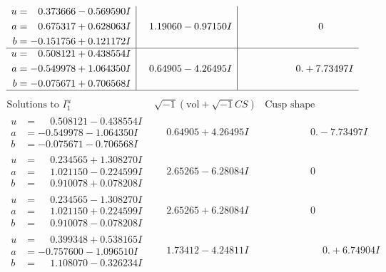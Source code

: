 \documentclass[1p]{elsarticle_modified}
\theoremstyle{definition}
\newcommand{\I}{\sqrt{-1}}
\begin{document}
$$\begin{array}{c|c|c}
\begin{aligned}
u &= \phantom{-}0.373666 - 0.569590 I \\
a &= \phantom{-}0.675317 + 0.628063 I \\
b &= -0.151756 + 0.121172 I\end{aligned}
 & \phantom{-}1.19060 - 0.97150 I & \phantom{-0.000000 } 0 \\ \hline\begin{aligned}
u &= \phantom{-}0.508121 + 0.438554 I \\
a &= -0.549978 + 1.064350 I \\
b &= -0.075671 + 0.706568 I\end{aligned}
 & \phantom{-}0.64905 - 4.26495 I & \phantom{-0.000000 -}0. + 7.73497 I\\
 \hline 
 \end{array}$$\newpage$$\begin{array}{c|c|c}  
\text{Solutions to }I^u_{1}& \I (\text{vol} + \sqrt{-1}CS) & \text{Cusp shape}\\
 \hline 
\begin{aligned}
u &= \phantom{-}0.508121 - 0.438554 I \\
a &= -0.549978 - 1.064350 I \\
b &= -0.075671 - 0.706568 I\end{aligned}
 & \phantom{-}0.64905 + 4.26495 I & \phantom{-0.000000 } 0. - 7.73497 I \\ \hline\begin{aligned}
u &= \phantom{-}0.234565 + 1.308270 I \\
a &= \phantom{-}1.021150 - 0.224599 I \\
b &= \phantom{-}0.910078 + 0.078208 I\end{aligned}
 & \phantom{-}2.65265 - 6.28084 I & \phantom{-0.000000 } 0 \\ \hline\begin{aligned}
u &= \phantom{-}0.234565 - 1.308270 I \\
a &= \phantom{-}1.021150 + 0.224599 I \\
b &= \phantom{-}0.910078 - 0.078208 I\end{aligned}
 & \phantom{-}2.65265 + 6.28084 I & \phantom{-0.000000 } 0 \\ \hline\begin{aligned}
u &= \phantom{-}0.399348 + 0.538165 I \\
a &= -0.757600 - 1.096510 I \\
b &= \phantom{-}1.108070 - 0.326234 I\end{aligned}
 & \phantom{-}1.73412 - 4.24811 I & \phantom{-0.000000 -}0. + 6.74904 I \\ \hline\begin{aligned}

\end{aligned}
\end{array}$$
\end{document}

